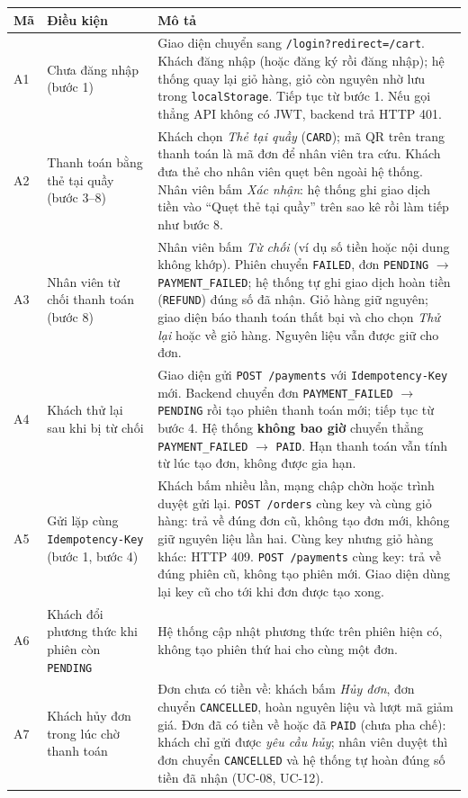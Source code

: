 \begin{longtable}{@{}p{0.8cm}p{3.6cm}p{11.6cm}@{}}
\toprule
\textbf{Mã} & \textbf{Điều kiện} & \textbf{Mô tả} \\
\midrule
\endhead
A1 & Chưa đăng nhập (bước 1)
  & Giao diện chuyển sang \texttt{/login?redirect=/cart}. Khách đăng nhập (hoặc đăng ký rồi đăng nhập); hệ thống quay lại giỏ hàng, giỏ còn nguyên nhờ lưu trong \texttt{localStorage}. Tiếp tục từ bước 1. Nếu gọi thẳng API không có JWT, backend trả HTTP 401. \\
A2 & Thanh toán bằng thẻ tại quầy (bước 3--8)
  & Khách chọn \emph{Thẻ tại quầy} (\texttt{CARD}); mã QR trên trang thanh toán là mã đơn để nhân viên tra cứu. Khách đưa thẻ cho nhân viên quẹt bên ngoài hệ thống. Nhân viên bấm \emph{Xác nhận}: hệ thống ghi giao dịch tiền vào ``Quẹt thẻ tại quầy'' trên sao kê rồi làm tiếp như bước 8. \\
A3 & Nhân viên từ chối thanh toán (bước 8)
  & Nhân viên bấm \emph{Từ chối} (ví dụ số tiền hoặc nội dung không khớp). Phiên chuyển \texttt{FAILED}, đơn \texttt{PENDING} $\rightarrow$ \texttt{PAYMENT\_FAILED}; hệ thống tự ghi giao dịch hoàn tiền (\texttt{REFUND}) đúng số đã nhận. Giỏ hàng giữ nguyên; giao diện báo thanh toán thất bại và cho chọn \emph{Thử lại} hoặc về giỏ hàng. Nguyên liệu vẫn được giữ cho đơn. \\
A4 & Khách thử lại sau khi bị từ chối
  & Giao diện gửi \texttt{POST /payments} với \texttt{Idempotency-Key} mới. Backend chuyển đơn \texttt{PAYMENT\_FAILED} $\rightarrow$ \texttt{PENDING} rồi tạo phiên thanh toán mới; tiếp tục từ bước 4. Hệ thống \textbf{không bao giờ} chuyển thẳng \texttt{PAYMENT\_FAILED} $\rightarrow$ \texttt{PAID}. Hạn thanh toán vẫn tính từ lúc tạo đơn, không được gia hạn. \\
A5 & Gửi lặp cùng \texttt{Idempotency-Key} (bước 1, bước 4)
  & Khách bấm nhiều lần, mạng chập chờn hoặc trình duyệt gửi lại. \texttt{POST /orders} cùng key và cùng giỏ hàng: trả về đúng đơn cũ, không tạo đơn mới, không giữ nguyên liệu lần hai. Cùng key nhưng giỏ hàng khác: HTTP 409. \texttt{POST /payments} cùng key: trả về đúng phiên cũ, không tạo phiên mới. Giao diện dùng lại key cũ cho tới khi đơn được tạo xong. \\
A6 & Khách đổi phương thức khi phiên còn \texttt{PENDING}
  & Hệ thống cập nhật phương thức trên phiên hiện có, không tạo phiên thứ hai cho cùng một đơn. \\
A7 & Khách hủy đơn trong lúc chờ thanh toán
  & Đơn chưa có tiền về: khách bấm \emph{Hủy đơn}, đơn chuyển \texttt{CANCELLED}, hoàn nguyên liệu và lượt mã giảm giá. Đơn đã có tiền về hoặc đã \texttt{PAID} (chưa pha chế): khách chỉ gửi được \emph{yêu cầu hủy}; nhân viên duyệt thì đơn chuyển \texttt{CANCELLED} và hệ thống tự hoàn đúng số tiền đã nhận (UC-08, UC-12). \\
\bottomrule
\end{longtable}

